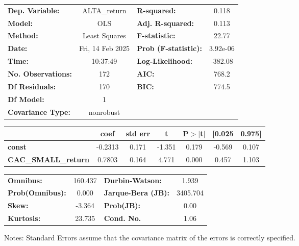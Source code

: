 \documentclass{report}
\begin{document}
\begin{center}
\begin{tabular}{lclc}
\toprule
\textbf{Dep. Variable:}     &   ALTA\_return   & \textbf{  R-squared:         } &     0.118   \\
\textbf{Model:}             &       OLS        & \textbf{  Adj. R-squared:    } &     0.113   \\
\textbf{Method:}            &  Least Squares   & \textbf{  F-statistic:       } &     22.77   \\
\textbf{Date:}              & Fri, 14 Feb 2025 & \textbf{  Prob (F-statistic):} &  3.92e-06   \\
\textbf{Time:}              &     10:37:49     & \textbf{  Log-Likelihood:    } &   -382.08   \\
\textbf{No. Observations:}  &         172      & \textbf{  AIC:               } &     768.2   \\
\textbf{Df Residuals:}      &         170      & \textbf{  BIC:               } &     774.5   \\
\textbf{Df Model:}          &           1      & \textbf{                     } &             \\
\textbf{Covariance Type:}   &    nonrobust     & \textbf{                     } &             \\
\bottomrule
\end{tabular}
\begin{tabular}{lcccccc}
                            & \textbf{coef} & \textbf{std err} & \textbf{t} & \textbf{P$> |$t$|$} & \textbf{[0.025} & \textbf{0.975]}  \\
\midrule
\textbf{const}              &      -0.2313  &        0.171     &    -1.351  &         0.179        &       -0.569    &        0.107     \\
\textbf{CAC\_SMALL\_return} &       0.7803  &        0.164     &     4.771  &         0.000        &        0.457    &        1.103     \\
\bottomrule
\end{tabular}
\begin{tabular}{lclc}
\textbf{Omnibus:}       & 160.437 & \textbf{  Durbin-Watson:     } &    1.939  \\
\textbf{Prob(Omnibus):} &   0.000 & \textbf{  Jarque-Bera (JB):  } & 3405.704  \\
\textbf{Skew:}          &  -3.364 & \textbf{  Prob(JB):          } &     0.00  \\
\textbf{Kurtosis:}      &  23.735 & \textbf{  Cond. No.          } &     1.06  \\
\bottomrule
\end{tabular}
\end{center}

Notes: \newline
 [1] Standard Errors assume that the covariance matrix of the errors is correctly specified.
\end{document}
